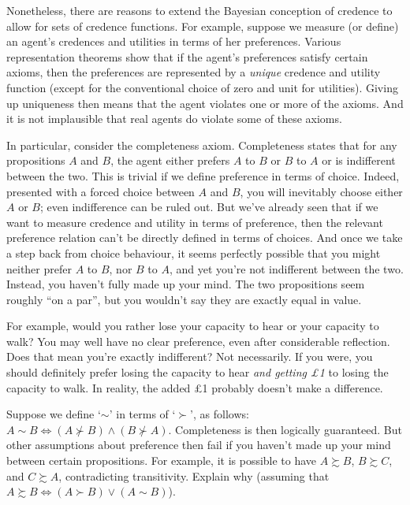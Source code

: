 Nonetheless, there are reasons to extend the Bayesian conception of
credence to allow for sets of credence functions. For example, suppose
we measure (or define) an agent's credences and utilities in terms of
her preferences. Various representation theorems show that if the
agent's preferences satisfy certain axioms, then the preferences are
represented by a \emph{unique} credence and utility function (except
for the conventional choice of zero and unit for utilities). Giving up
uniqueness then means that the agent violates one or more of the
axioms. And it is not implausible that real agents do violate some of
these axioms.

In particular, consider the completeness axiom. Completeness states
that for any propositions $A$ and $B$, the agent either prefers $A$ to
$B$ or $B$ to $A$ or is indifferent between the two. This is trivial
if we define preference in terms of choice. Indeed, presented with a
forced choice between $A$ and $B$, you will inevitably choose either
$A$ or $B$; even indifference can be ruled out. But we've already seen
that if we want to measure credence and utility in terms of
preference, then the relevant preference relation can't be directly
defined in terms of choices. And once we take a step back from choice
behaviour, it seems perfectly possible that you might neither prefer
$A$ to $B$, nor $B$ to $A$, and yet you're not indifferent between the
two. Instead, you haven't fully made up your mind. The two
propositions seem roughly ``on a par'', but you wouldn't say they are
exactly equal in value.

For example, would you rather lose your capacity to hear or your
capacity to walk? You may well have no clear preference, even after
considerable reflection. Does that mean you're exactly indifferent?
Not necessarily. If you were, you should definitely prefer losing the
capacity to hear \emph{and getting £1} to losing the capacity to
walk. In reality, the added £1 probably doesn't make a difference.

\begin{exercise}{2}
  Suppose we define `$\sim$' in terms of `$\succ$', as follows: $A\sim
  B \Leftrightarrow (A \not\succ B) \land (B \not\succ
  A)$. Completeness is then logically guaranteed. But other
  assumptions about preference then fail if you haven't made up your
  mind between certain propositions. For example, it is possible to
  have $A \succsim B$, $B \succsim C$, and $C \succsim A$,
  contradicting transitivity. Explain why (assuming that $A \succsim B
  \Leftrightarrow (A \succ B) \lor (A \sim B)$).
\end{exercise}

